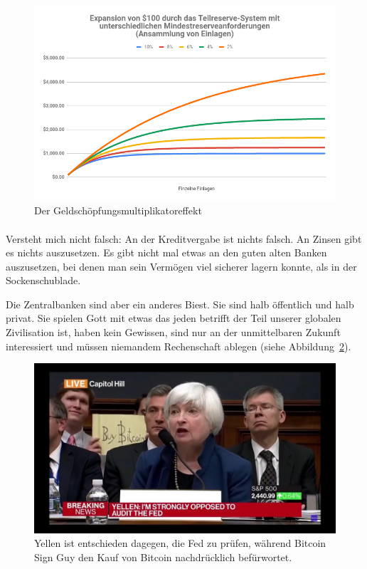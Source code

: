 \begin{figure}
  \centering
  \includegraphics{assets/images/money-multiplier-de.png}
  \caption{Der Geldschöpfungsmultiplikatoreffekt}
  \label{fig:money-multiplier}
\end{figure}

\paragraph{}
Versteht mich nicht falsch: An der Kreditvergabe ist nichts falsch. An Zinsen
gibt es nichts auszusetzen. Es gibt nicht mal etwas an den guten alten Banken
auszusetzen, bei denen man sein Vermögen viel sicherer lagern konnte, als in der
Sockenschublade.

Die Zentralbanken sind aber ein anderes Biest. Sie sind halb öffentlich und halb
privat. Sie spielen Gott mit etwas das jeden betrifft der Teil unserer globalen
Zivilisation ist, haben kein Gewissen, sind nur an der unmittelbaren Zukunft
interessiert und müssen niemandem Rechenschaft ablegen (siehe
Abbildung~\ref{fig:bsg}).

\begin{figure}
  \centering
  \includegraphics{assets/images/bsg.jpg}
  \caption{Yellen ist entschieden dagegen, die Fed zu prüfen, während Bitcoin
  Sign Guy den Kauf von Bitcoin nachdrücklich befürwortet.}
  \label{fig:bsg}
\end{figure}

